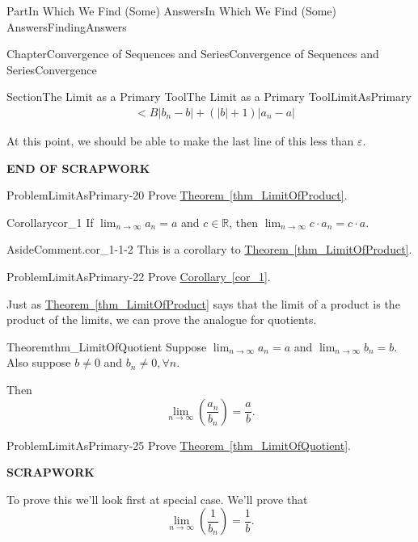 \documentclass[oneside,10pt,]{book}
\newcommand{\xreffont}{\relax}
\newcommand{\terminology}[1]{\textbf{#1}}
\numberwithin{equation}{part}
\newcommand{\abs}[1]{\left|#1\right|}
\def\limit#1#2#3{{\displaystyle\lim_{#1\rightarrow #2}#3}}
\def\limitt#1#2#3{{\displaystyle\lim_{#1\rightarrow #2}\textstyle #3}}
\newcommand{\eps}{\varepsilon}
\newcommand{\lt}{<}
\newcommand{\amp}{&}
\begin{document}
\begin{partptx}{Part}{In Which We Find (Some) Answers}{}{In Which We Find (Some) Answers}{}{}{FindingAnswers}
\begin{chapterptx}{Chapter}{Convergence of Sequences and Series}{}{Convergence of Sequences and Series}{}{}{Convergence}
\begin{sectionptx}{Section}{The Limit as a Primary Tool}{}{The Limit as a Primary Tool}{}{}{LimitAsPrimary}
\begin{align*}
\amp \lt B \abs{b_n-b}+\left(\abs{b}+1\right)\abs{a_n-a}
\end{align*}
%
\par
At this point, we should be able to make the last line of this less than \(\eps\).%
\par
\terminology{END OF SCRAPWORK}%
\begin{problem}{Problem}{}{LimitAsPrimary-20}%
 Prove \hyperref[thm_LimitOfProduct]{Theorem~{\xreffont\ref{thm_LimitOfProduct}}}.%
\end{problem}
\begin{corollary}{Corollary}{}{}{cor_1}%
If \(\displaystyle\lim_{n\rightarrow\infty}a_n=a\) and \(c\in\mathbb{R}\), then \(\displaystyle\lim_{n\rightarrow\infty}c\cdot a_n=c\cdot a\).%
\begin{aside}{Aside}{Comment.}{cor_1-1-2}%
This is a corollary to \hyperref[thm_LimitOfProduct]{Theorem~{\xreffont\ref{thm_LimitOfProduct}}}.%
\end{aside}
\end{corollary}
\begin{problem}{Problem}{}{LimitAsPrimary-22}%
 Prove  \hyperref[cor_1]{Corollary~{\xreffont\ref{cor_1}}}.%
\end{problem}
Just as \hyperref[thm_LimitOfProduct]{Theorem~{\xreffont\ref{thm_LimitOfProduct}}} says that the limit of a product is the product of the limits, we can prove the analogue for quotients.%
\begin{theorem}{Theorem}{}{}{thm_LimitOfQuotient}%
%
Suppose \(\limitt{n}{\infty}{a_n}=a\) and \(\limitt{n}{\infty}{b_n}=b\). Also suppose \(b\neq 0\) and \(b_n\neq 0, \forall n\).%
\par
Then%
\begin{equation*}
\limit{n}{\infty}{\left(\frac{a_n}{b_n}\right)}=\frac{a}{b}\text{.}
\end{equation*}
%
\end{theorem}
\begin{problem}{Problem}{}{LimitAsPrimary-25}%
 Prove \hyperref[thm_LimitOfQuotient]{Theorem~{\xreffont\ref{thm_LimitOfQuotient}}}.%
\par
\terminology{SCRAPWORK}%
\par
To prove this we'll  look first  at  special case. We'll  prove  that%
\begin{equation*}
\limitt{n}{\infty}{\left(\frac{1}{b_n}\right)}=\frac{1}{b}\text{.}

\end{equation*}
\end{problem}
\end{sectionptx}
\end{chapterptx}
\end{partptx}
\end{document}
